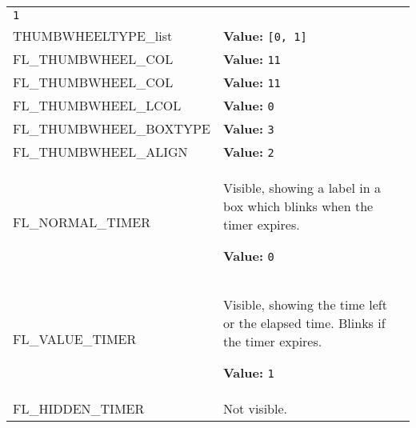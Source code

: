 \begin{longtable}{|p{\varnamewidth}|p{\vardescrwidth}|l}
{\tt 1}&\\
\cline{1-2}
\raggedright T\-H\-U\-M\-B\-W\-H\-E\-E\-L\-T\-Y\-P\-E\-\_\-l\-i\-s\-t\- & \raggedright \textbf{Value:} 
{\tt \texttt{[}0\texttt{, }1\texttt{]}}&\\
\cline{1-2}
\raggedright F\-L\-\_\-T\-H\-U\-M\-B\-W\-H\-E\-E\-L\-\_\-C\-O\-L\-1\- & \raggedright \textbf{Value:} 
{\tt 11}&\\
\cline{1-2}
\raggedright F\-L\-\_\-T\-H\-U\-M\-B\-W\-H\-E\-E\-L\-\_\-C\-O\-L\-2\- & \raggedright \textbf{Value:} 
{\tt 11}&\\
\cline{1-2}
\raggedright F\-L\-\_\-T\-H\-U\-M\-B\-W\-H\-E\-E\-L\-\_\-L\-C\-O\-L\- & \raggedright \textbf{Value:} 
{\tt 0}&\\
\cline{1-2}
\raggedright F\-L\-\_\-T\-H\-U\-M\-B\-W\-H\-E\-E\-L\-\_\-B\-O\-X\-T\-Y\-P\-E\- & \raggedright \textbf{Value:} 
{\tt 3}&\\
\cline{1-2}
\raggedright F\-L\-\_\-T\-H\-U\-M\-B\-W\-H\-E\-E\-L\-\_\-A\-L\-I\-G\-N\- & \raggedright \textbf{Value:} 
{\tt 2}&\\
\cline{1-2}
\raggedright F\-L\-\_\-N\-O\-R\-M\-A\-L\-\_\-T\-I\-M\-E\-R\- & \raggedright Visible, showing a label in a box which blinks when the timer expires.

\textbf{Value:} 
{\tt 0}&\\
\cline{1-2}
\raggedright F\-L\-\_\-V\-A\-L\-U\-E\-\_\-T\-I\-M\-E\-R\- & \raggedright Visible, showing the time left or the elapsed time. Blinks if the
timer expires.

\textbf{Value:} 
{\tt 1}&\\
\cline{1-2}
\raggedright F\-L\-\_\-H\-I\-D\-D\-E\-N\-\_\-T\-I\-M\-E\-R\- & \raggedright Not visible.


\end{longtable}
